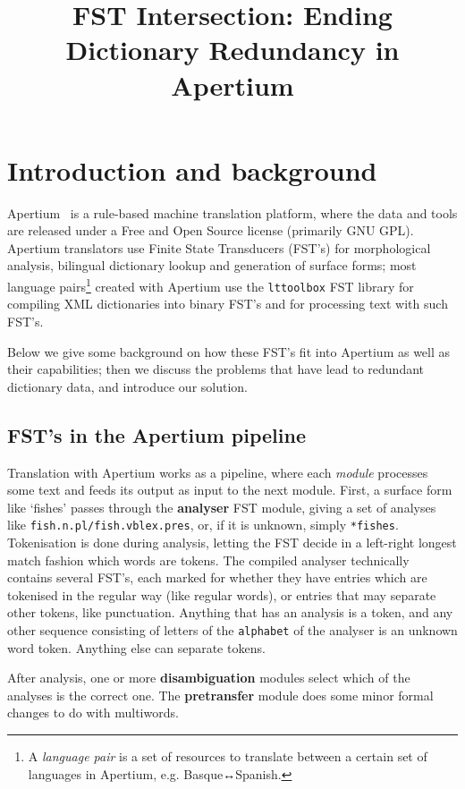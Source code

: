\documentclass[10pt, a4paper]{article}
\title{FST Intersection: Ending Dictionary Redundancy in Apertium} %
\newcommand{\ana}[1]{\texttt{#1}}
\newcommand{\f}[1]{`#1'}
\newcommand{\tool}[1]{\texttt{#1}}
\begin{document}
\maketitleabstract

\section{Introduction and background}

Apertium~\cite{forcada2011afp} is a rule-based machine translation
platform, where the data and tools are released under a Free and Open
Source license (primarily GNU GPL). Apertium translators use Finite
State Transducers (FST's) for morphological analysis, bilingual
dictionary lookup and generation of surface forms; most language
pairs\footnote{A \emph{language pair} is a set of resources to
  translate between a certain set of languages in Apertium, e.g.
  Basque↔Spanish.} created with Apertium use the \tool{lttoolbox}
FST library for compiling XML dictionaries into binary FST's and for
processing text with such FST's.

Below we give some background on how these FST's fit into Apertium as
well as their capabilities; then we discuss the problems that have
lead to redundant dictionary data, and introduce our solution.

\subsection{FST's in the Apertium pipeline}
\label{sec:pipeline}

Translation with Apertium works as a pipeline, where each
\emph{module} processes some text and feeds its output as input to the
next module. First, a surface form like \f{fishes} passes through the
\textbf{analyser} FST module, giving a set of analyses like
\ana{fish.n.pl/fish.vblex.pres}, or, if it is unknown, simply
\ana{*fishes}. Tokenisation is done during analysis, letting the FST
decide in a left-right longest match fashion which words are tokens.
The compiled analyser technically contains several FST's, each marked
for whether they have entries which are tokenised in the regular
way (like regular words), or entries that may separate other tokens,
like punctuation. Anything that has an analysis is a token, and any
other sequence consisting of letters of the \texttt{alphabet} of the
analyser is an unknown word token. Anything else can separate tokens.

After analysis, one or more \textbf{disambiguation} modules select
which of the analyses is the correct one. The \textbf{pretransfer}
module does some minor formal changes to do with multiwords.
\end{document}
